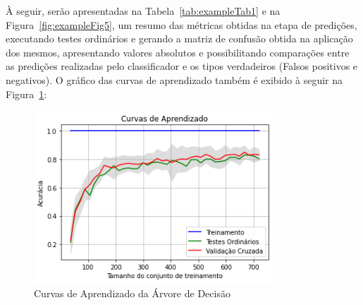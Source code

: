 \documentclass[12pt]{article}
\begin{document}
À seguir, serão apresentadas na Tabela~\ref{tab:exampleTab1} e na Figura~\ref{fig:exampleFig5}, um resumo das métricas obtidas na etapa de predições, executando testes ordinários e gerando a matriz de confusão obtida na aplicação dos mesmos, apresentando valores absolutos e possibilitando comparações entre as predições realizadas pelo classificador e os tipos verdadeiros (Falsos positivos e negativos). O gráfico das curvas de aprendizado também é exibido à seguir na Figura~\ref{fig:exampleFig4}:

\begin{figure}[H]
    \centering
    \includegraphics[width=0.8\textwidth]{Images/learning_curves_tree.png}
    \caption{Curvas de Aprendizado da Árvore de Decisão}
    \label{fig:exampleFig4}
\end{figure}
\end{document}
